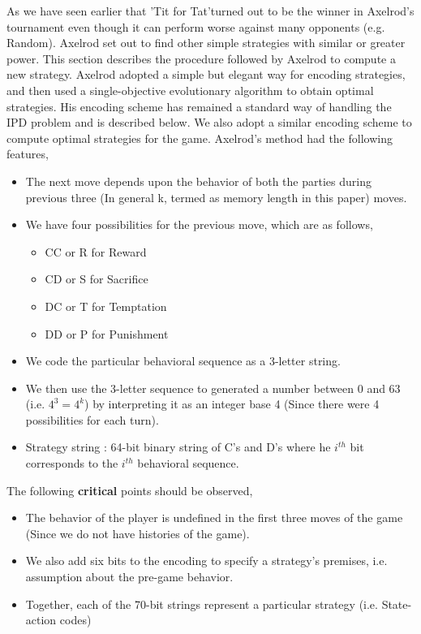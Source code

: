\documentclass[a4paper]{article}
\begin{document}
As we have seen earlier that 'Tit for Tat'turned out to be the winner in Axelrod's tournament even though it can perform worse against many opponents (e.g. Random). Axelrod set out to find other simple strategies with similar or greater power. This section describes the procedure followed by Axelrod to compute a new strategy.
Axelrod adopted a simple but elegant way for encoding strategies, and then used a single-objective evolutionary algorithm to obtain optimal strategies. His encoding scheme has remained a standard way of handling the IPD problem and is described below. We also adopt a similar encoding scheme to compute optimal strategies for the game. Axelrod's method had the following features,
	\begin{itemize}
	\item The next move depends upon the behavior of both the parties during previous three (In general k, termed as memory length in this paper) moves.
	\item We have four possibilities for the previous move, which are as follows,
	\begin{itemize}
		\item CC or R for Reward
		\item CD or S for Sacrifice
		\item DC or T for Temptation
		\item DD or P for Punishment
	\end{itemize}		
	\item We code the particular behavioral sequence as a 3-letter string.	
	\item We then use the 3-letter sequence to generated a number between 0 and 63 (i.e. $4^{3} = 4^{k}$) by interpreting it as an integer base 4 (Since there were 4 possibilities for each turn).
	\item Strategy string : 64-bit binary string of C's and D's where he $i^{th}$ bit corresponds to the $i^{th}$ behavioral sequence.
	\end{itemize}

	The following \textbf{critical} points should be observed,
	\begin{itemize}
	\item The behavior of the player is undefined in the first three moves of the game (Since we do not have histories of the game).
	\item We also add six bits to the encoding to specify a strategy's premises, i.e. assumption about the pre-game behavior.
	\item Together, each of the 70-bit strings represent a particular strategy (i.e. State-action codes)	
	\end{itemize}		
	
\end{document}
